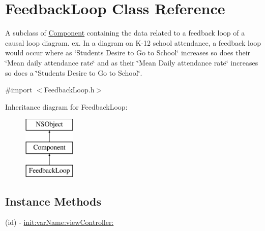 \hypertarget{interface_feedback_loop}{\section{Feedback\-Loop Class Reference}
\label{interface_feedback_loop}
}


A subclass of \hyperlink{interface_component}{Component} containing the data related to a feedback loop of a causal loop diagram. ex. In a diagram on K-\/12 school attendance, a feedback loop would occur where as \char`\"{}\-Students Desire to Go to School\char`\"{} increases so does their \char`\"{}\-Mean daily attendance rate\char`\"{} and as their \char`\"{}\-Mean Daily attendance rate\char`\"{} increases so does a \char`\"{}\-Students Desire to Go to School\char`\"{}.  




{\ttfamily \#import $<$Feedback\-Loop.\-h$>$}

Inheritance diagram for Feedback\-Loop\-:\begin{figure}[H]
\begin{center}
\leavevmode
\includegraphics[height=3.000000cm]{interface_feedback_loop}
\end{center}
\end{figure}
\subsection*{Instance Methods}
\begin{DoxyCompactItemize}
\item 
(id) -\/ \hyperlink{interface_feedback_loop_a247de3efb61bb927f8e2e8cc9552bd72}{init\-:var\-Name\-:view\-Controller\-:}
\end{DoxyCompactItemize}
